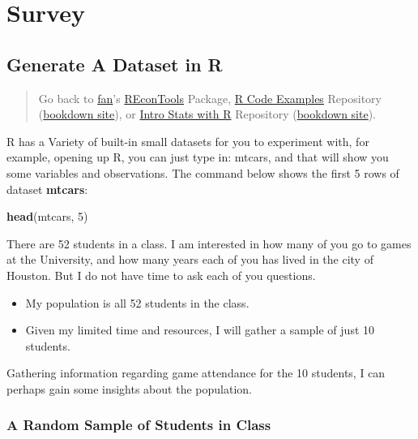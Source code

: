 \documentclass[
]{book}
\newenvironment{Shaded}{\begin{snugshade}}{\end{snugshade}}
\newcommand{\DecValTok}[1]{\textcolor[rgb]{0.00,0.00,0.81}{#1}}
\newcommand{\KeywordTok}[1]{\textcolor[rgb]{0.13,0.29,0.53}{\textbf{#1}}}
\newcommand{\NormalTok}[1]{#1}
\providecommand{\tightlist}{%
  \setlength{\itemsep}{0pt}\setlength{\parskip}{0pt}}
\begin{document}
\hypertarget{survey}{%
\chapter{Survey}\label{survey}}

\hypertarget{generate-a-dataset-in-r}{%
\section{Generate A Dataset in R}\label{generate-a-dataset-in-r}}

\begin{quote}
Go back to \href{http://fanwangecon.github.io/}{fan}'s \href{https://fanwangecon.github.io/REconTools/}{REconTools} Package, \href{https://fanwangecon.github.io/R4Econ/}{R Code Examples} Repository (\href{https://fanwangecon.github.io/R4Econ/bookdown}{bookdown site}), or \href{https://fanwangecon.github.io/Stat4Econ/}{Intro Stats with R} Repository (\href{https://fanwangecon.github.io/Stat4Econ/bookdown}{bookdown site}).
\end{quote}

R has a Variety of built-in small datasets for you to experiment with, for example, opening up R, you can just type in: mtcars, and that will show you some variables and observations. The command below shows the first 5 rows of dataset \textbf{mtcars}:

\begin{Shaded}
\begin{Highlighting}[]
\KeywordTok{head}\NormalTok{(mtcars, }\DecValTok{5}\NormalTok{)}
\end{Highlighting}
\end{Shaded}

There are 52 students in a class. I am interested in how many of you go to games at the University, and how many years each of you has lived in the city of Houston. But I do not have time to ask each of you questions.

\begin{itemize}
\tightlist
\item
  My population is all 52 students in the class.
\item
  Given my limited time and resources, I will gather a sample of just 10 students.
\end{itemize}

Gathering information regarding game attendance for the 10 students, I can perhaps gain some insights about the population.

\hypertarget{a-random-sample-of-students-in-class}{%
\subsection{A Random Sample of Students in Class}\label{a-random-sample-of-students-in-class}}
\end{document}
